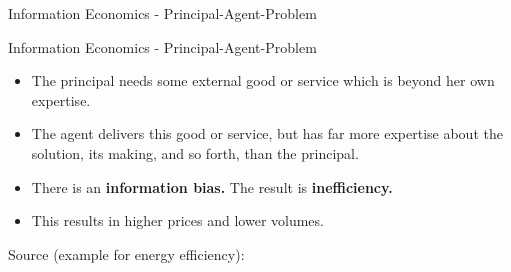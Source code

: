     
    
    



\begin{frame}{Information Economics - Principal-Agent-Problem }
    \end{frame}

\begin{frame}{Information Economics - Principal-Agent-Problem }    \begin{minipage}{0.7\textwidth}
    
        \begin{itemize}
            \item The principal needs some external good or service which is beyond her own expertise.
        
            \item The agent delivers this good or service, but has far more expertise about the solution, its making, and so forth, than the principal. 
        
            \item There is an \textbf{information bias.} The result is \textbf{inefficiency.}
            
            \item This results in higher prices and lower volumes.
        
        \end{itemize}
    
    \end{minipage}
    \par\medskip
    Source (example for energy efficiency): \cite{OgdenCharlesKay1985Tmom}

\end{frame}

